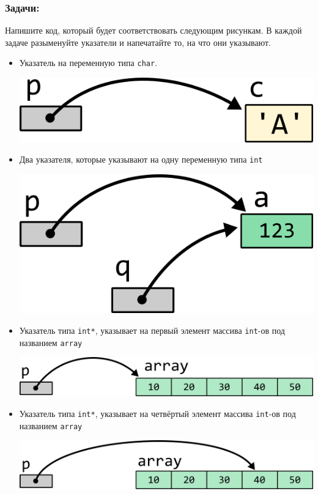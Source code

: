 \documentclass[10pt]{article}
\begin{document}
\subsubsection*{Задачи:}
Напишите код, который будет соответствовать следующим рисункам. В каждой задаче разыменуйте указатели и напечатайте то, на что они указывают.
\begin{itemize}
\item Указатель на переменную типа \texttt{char}.
\begin{center}
\includegraphics[scale=1]{../images/pointer_tasks/pointer_task_char.png}
\end{center}

\item Два указателя, которые указывают на одну переменную типа \texttt{int}
\begin{center}
\includegraphics[scale=1]{../images/pointer_tasks/pointer_tasks_two_int.png}
\end{center}

\item Указатель типа \texttt{int*}, указывает на первый элемент массива \texttt{int}-ов под названием \texttt{array}
\begin{center}
\includegraphics[scale=1]{../images/pointer_tasks/pointer_task_array.png}
\end{center}

\item Указатель типа \texttt{int*}, указывает на четвёртый элемент массива \texttt{int}-ов под названием \texttt{array}
\begin{center}
\includegraphics[scale=1]{../images/pointer_tasks/pointer_task_array_4.png}
\end{center}



\end{itemize}
\end{document}
